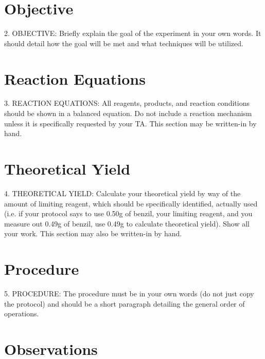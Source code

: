 \documentclass[letterpaper,amsmath,amssymb,prb,preprint,12pt]{revtex4-1}%
\begin{document}


\newpage



\section{Objective}

2. OBJECTIVE: Briefly explain the goal of the experiment in your own words. It
should detail how the goal will be met and what techniques will be utilized.

\section{Reaction Equations}

3. REACTION EQUATIONS: All reagents, products, and reaction conditions should
be shown in a balanced equation. Do not include a reaction mechanism unless it is
specifically requested by your TA. This section may be written-in by hand.

\section{Theoretical Yield}

4. THEORETICAL YIELD: Calculate your theoretical yield by way of the amount of
limiting reagent, which should be specifically identified, actually used (i.e. if your
protocol says to use 0.50g of benzil, your limiting reagent, and you measure out
0.49g of benzil, use 0.49g to calculate theoretical yield). Show all your work. This
section may also be written-in by hand.

\section{Procedure}

5. PROCEDURE: The procedure must be in your own words (do not just copy the
protocol) and should be a short paragraph detailing the general order of operations.

\section{Observations}
\end{document}
